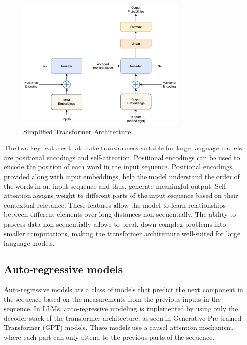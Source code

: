 \begin{figure}[h]
    \centering
    \includegraphics[width=0.75\textwidth]{Figures/literature_review/transformer_architecture.jpeg} 
    \caption{Simplified Transformer Architecture}
    \label{fig:TransformerArchitecture}
\end{figure}

The two key features that make transformers suitable for large language models are positional encodings and self-attention. Positional encodings can be used to encode the position of each word in the input sequence. Positional encodings, provided along with input embeddings, help the model understand the order of the words in an input sequence and thus, generate meaningful output. Self-attention assigns weight to different parts of the input sequence based on their contextual relevance. These features allow the model to learn relationships between different elements over long distances non-sequentially. The ability to process data non-sequentially allows to break down complex problems into smaller computations, making the transformer architecture well-suited for large language models.

\subsection{Auto-regressive models}
Auto-regressive models are a class of models that predict the next component in the sequence based on the measurements from the previous inputs in the sequence. In LLMs, auto-regressive modeling is implemented by using only the decoder stack of the transformer architecture, as seen in Generative Pre-trained Transformer (GPT) models. These models use a causal attention mechanism, where each part can only attend to the previous parts of the sequence.  

